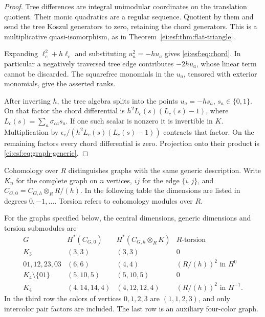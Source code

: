 \begin{proof}
Tree differences are integral unimodular coordinates
on the translation quotient. Their monic quadratics
are a regular sequence. Quotient by them and send the
tree Koszul generators to zero, retaining the chord
generators. This is a multiplicative quasi-isomorphism,
as in Theorem~\ref{ei:esf:thm:flat-triangle}.

Expanding $\ell_c^2+h\ell_c$ and substituting
$u_a^2=-hu_a$ gives \eqref{ei:esf:eq:chord}.
In particular a negatively traversed tree edge contributes
$-2hu_a$, whose linear term cannot be discarded.
The squarefree monomials in the $u_a$, tensored with
exterior monomials, give the asserted ranks.

After inverting $h$, the tree algebra splits into the
points $u_a=-hs_a$, $s_a\in\{0,1\}$. On that factor the
chord differential is
$h^2L_c(s)(L_c(s)-1)$, where $L_c(s)=\sum_a\sigma_{ca}s_a$.
If one such scalar is nonzero it is invertible in $K$.
Multiplication by $\epsilon_c/(h^2L_c(s)(L_c(s)-1))$
contracts that factor. On the remaining factors every
chord differential is zero. Projection onto their product
is \eqref{ei:esf:eq:graph-generic}.
\end{proof}

Cohomology over $R$ distinguishes graphs with the same
generic description. Write $K_n$ for the complete graph
on $n$ vertices, $ij$ for the edge $\{i,j\}$, and
$C_{G,0}=C_{G,h}\otimes_R R/(h)$.
In the following table the dimensions are listed in degrees
$0,-1,\ldots$. Torsion refers to cohomology modules over $R$.

\begin{proposition}\label{ei:esf:prop:graph-examples}
For the graphs specified below, the central dimensions,
generic dimensions and torsion submodules are
\[
\begin{array}{c|c|c|c}
 G&H^*(C_{G,0})&H^*(C_{G,h}\otimes_RK)&R\text{-torsion}\\\hline
 K_3&(3,3)&(3,3)&0\\
 01,12,23,03&(6,6)&(4,4)&(R/(h))^2\text{ in }H^0\\
 K_4\setminus\{01\}&(5,10,5)&(5,10,5)&0\\
 K_4&(4,14,14,4)&(4,12,12,4)&(R/(h))^2\text{ in }H^{-1}.
\end{array}
\]
In the third row the colors of vertices $0,1,2,3$ are
$(1,1,2,3)$, and only intercolor pair factors are included.
The last row is an auxiliary four-color graph.
\end{proposition}

